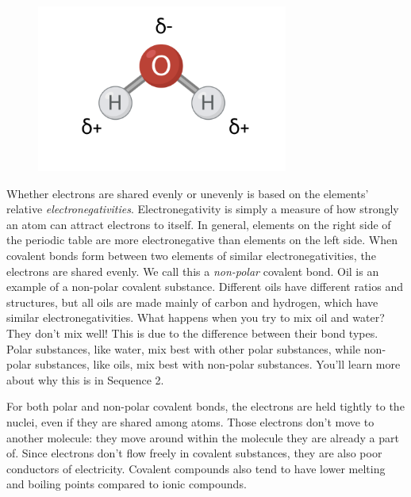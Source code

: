\begin{figure}
\noindent\includegraphics[width=3.25in]{water_polar.png}
\caption{}
\label{fig:water_polar}
\end{figure}

Whether electrons are shared evenly or unevenly is based on the elements' relative 
\textit{electronegativities}. Electronegativity is simply
a measure of how strongly an atom can attract electrons to itself. In general, 
elements on the right side of the periodic table are more electronegative than 
elements on the left side. When covalent bonds form between two elements of similar electronegativities, the electrons are shared evenly. We call this a \textit{non-polar}
covalent bond. Oil is an example of a non-polar covalent substance. Different 
oils have different ratios and structures, but all oils are made mainly of carbon 
and hydrogen, which have similar electronegativities. What happens when you try to 
mix oil and water? They don't mix well! This is due to the difference between 
their bond types. Polar substances, like water, mix best with other polar 
substances, while non-polar substances, like oils, mix best with non-polar 
substances. You'll learn more about why this is in Sequence 2.

For both polar and non-polar covalent bonds, the electrons are held tightly to 
the nuclei, even if they are shared among atoms. Those electrons don't move to 
another molecule: they move around within the molecule they are already a part 
of. Since electrons don't flow freely in covalent substances, they are also poor 
conductors of electricity. Covalent compounds also tend to have lower melting and 
boiling points compared to ionic compounds. 

